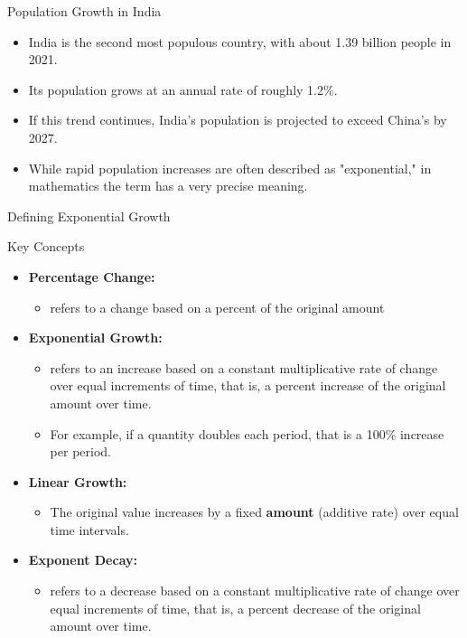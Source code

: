 \begin{frame}{Population Growth in India}
  \begin{itemize}
    \item India is the second most populous country, with about 1.39 billion people in 2021.
    \item Its population grows at an annual rate of roughly 1.2\%.
    \item If this trend continues, India's population is projected to exceed China’s by 2027.
    \item While rapid population increases are often described as "exponential," in mathematics the term has a very precise meaning.
  \end{itemize}
\end{frame}

\begin{frame}{Defining Exponential Growth}
  \begin{block}{Key Concepts}
    \begin{itemize}
      \item \textbf{Percentage Change:} 
      \begin{itemize}
        \item refers to a change based on a percent of the original amount
      \end{itemize}
      \item \textbf{Exponential Growth:} 
        \begin{itemize}
          \item refers to an increase based on a constant multiplicative rate of change over equal increments of time, that is, a percent increase of the original amount over time.
          \item For example, if a quantity doubles each period, that is a 100\% increase per period.
        \end{itemize}
      \item \textbf{Linear Growth:} 
        \begin{itemize}
          \item The original value increases by a fixed \textbf{amount} (additive rate) over equal time intervals.
        \end{itemize}
        \item \textbf{Exponent Decay:}
        \begin{itemize}
          \item refers to a decrease based on a constant multiplicative rate of change over equal increments of time, that is, a percent decrease of the original amount over time.
        \end{itemize}
    \end{itemize}
  \end{block}
\end{frame}

